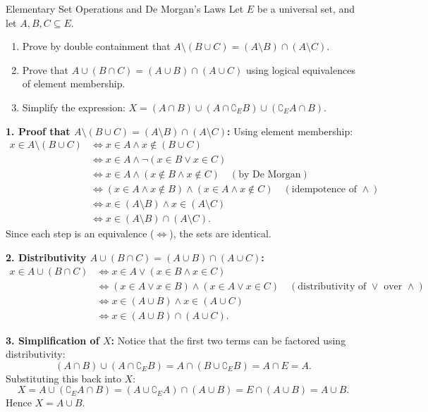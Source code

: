 \begin{exercise}{Elementary Set Operations and De Morgan's Laws}
Let $E$ be a universal set, and let $A, B, C \subseteq E$.
\begin{enumerate}[leftmargin=1.5em,itemsep=2pt]
  \item Prove by double containment that $A \setminus (B \cup C) = (A \setminus B) \cap (A \setminus C)$.
  \item Prove that $A \cup (B \cap C) = (A \cup B) \cap (A \cup C)$ using logical equivalences of element membership.
  \item Simplify the expression: $X = (A \cap B) \cup (A \cap \complement_E B) \cup (\complement_E A \cap B)$.
\end{enumerate}
\end{exercise}

\begin{tabletworkspace}[5.0cm]
\end{tabletworkspace}

\begin{solution}
\textbf{1. Proof that $A \setminus (B \cup C) = (A \setminus B) \cap (A \setminus C)$:}
Using element membership:
\begin{align*}
x \in A \setminus (B \cup C) &\iff x \in A \land x \notin (B \cup C) \\
&\iff x \in A \land \neg(x \in B \lor x \in C) \\
&\iff x \in A \land (x \notin B \land x \notin C) \quad (\text{by De Morgan}) \\
&\iff (x \in A \land x \notin B) \land (x \in A \land x \notin C) \quad (\text{idempotence of } \land) \\
&\iff x \in (A \setminus B) \land x \in (A \setminus C) \\
&\iff x \in (A \setminus B) \cap (A \setminus C).
\end{align*}
Since each step is an equivalence ($\iff$), the sets are identical.

\textbf{2. Distributivity $A \cup (B \cap C) = (A \cup B) \cap (A \cup C)$:}
\begin{align*}
x \in A \cup (B \cap C) &\iff x \in A \lor (x \in B \land x \in C) \\
&\iff (x \in A \lor x \in B) \land (x \in A \lor x \in C) \quad (\text{distributivity of } \lor \text{ over } \land) \\
&\iff x \in (A \cup B) \land x \in (A \cup C) \\
&\iff x \in (A \cup B) \cap (A \cup C).
\end{align*}

\textbf{3. Simplification of $X$:}
Notice that the first two terms can be factored using distributivity:
\[
(A \cap B) \cup (A \cap \complement_E B) = A \cap (B \cup \complement_E B) = A \cap E = A.
\]
Substituting this back into $X$:
\[
X = A \cup (\complement_E A \cap B) = (A \cup \complement_E A) \cap (A \cup B) = E \cap (A \cup B) = A \cup B.
\]
Hence $X = A \cup B$.
\end{solution}

